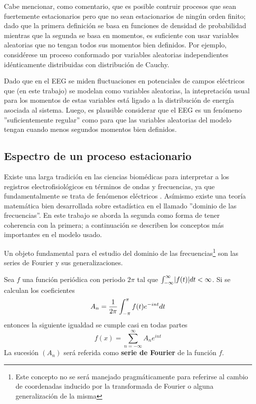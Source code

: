 Cabe mencionar, como comentario, que es posible contruir procesos que sean fuertemente
estacionarios pero que no sean estacionarios de ning\'un orden finito; dado que
la primera definici\'on se basa en funciones de densidad de probabilidad mientras que la segunda
se basa en momentos, es suficiente con usar variables aleatorias que no tengan todos
sus momentos bien definidos. Por ejemplo, consid\'erese un proceso conformado por variables
aleatorias independientes id\'enticamente distribuidas con distribuci\'on de Cauchy.

Dado que en el EEG se miden fluctuaciones en potenciales de campos el\'ectricos
que (en este trabajo) se modelan como variables aleatorias, 
la intepretaci\'on usual para los momentos de estas variables est\'a ligado a la distribuci\'on de
energ\'ia asociada al sistema. Luego, es plausible considerar que el EEG es un fen\'omeno
''suficientemente regular'' como para que las variables aleatorias del modelo tengan cuando
menos segundos momentos bien definidos.


\subsection{Espectro de un proceso estacionario}

Existe una larga tradici\'on en las ciencias biom\'edicas para interpretar a los registros
electrofisiol\'ogicos en t\'erminos de ondas y frecuencias, ya que fundamentalmente se
trata de fen\'omenos el\'ectricos \cite{Kaiser00}. 
As\'imismo existe una teor\'ia matem\'atica bien desarrollada sobre estad\'istica en el 
llamado ''dominio de las frecuencias''. 
En este trabajo se aborda la segunda como forma de tener coherencia con la primera; a continuaci\'on
se describen los conceptos m\'as importantes en el modelo usado.

Un objeto fundamental para el estudio del dominio de las frecuencias\footnote{Este concepto 
no se
ser\'a manejado pragm\'aticamente para referirse
al cambio de coordenadas inducido por la transformada de Fourier o alguna generalizaci\'on de la 
misma} son las series de Fourier y sus generalizaciones. 

\begin{defn}
Sea $f$ una funci\'on peri\'odica con periodo $2\pi$ tal que $\int_{-\infty}^{\infty} \lvert f(t) \rvert dt < \infty$. 
Si se calculan los coeficientes
\begin{equation*}
A_n = \frac{1}{2\pi} \int_{-\pi}^{\pi} f(t) e^{- i n t} dt
\end{equation*}
entonces la siguiente igualdad se cumple casi en todas partes
\begin{equation*}
f(x) = \sum_{n=-\infty}^{\infty} A_n e^{i n t}
\end{equation*}
La sucesi\'on $\left( A_n \right)$ ser\'a referida como \textbf{serie de Fourier} de la funci\'on
$f$.
\label{FourierClasico}
\end{defn}

